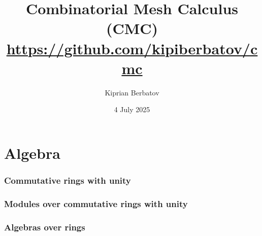 \documentclass{article}
\title{Combinatorial Mesh Calculus (CMC)\\
       \url{https://github.com/kipiberbatov/cmc}}
\author{Kiprian Berbatov}
\date{4 July 2025}
\theoremstyle{definition}
\begin{document}

\maketitle

\tableofcontents
\NewCommandCopy\oricontentsline\contentsline
\makeatletter
\RenewDocumentCommand{}
{%
  {\let\numberline\@gobble
    }%
}
\makeatother

\listoffigures

\listoftables


\part{Algebra}

\section{Commutative rings with unity}
\label{section:commutative_rings_with_unity}









\section{Modules over commutative rings with unity}
\label{section:modules_over_commutative_rings_with_unity}









\section{Algebras over rings}
\label{section:algebras_over_rings}




\end{document}

